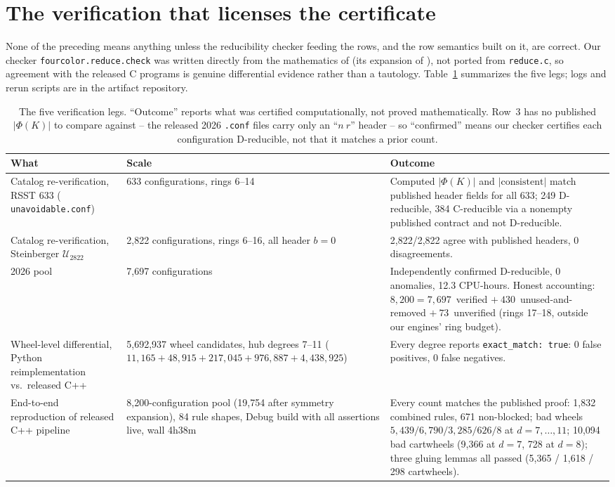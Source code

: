 \documentclass[11pt]{article}
\theoremstyle{definition}
\begin{document}
\section{The verification that licenses the certificate}
\label{sec:verify}

None of the preceding means anything unless the reducibility checker feeding the
rows, and the row semantics built on it, are correct. Our checker
\texttt{fourcolor.reduce.check} was written directly from the mathematics of
\cite{rsst-reduce} (its expansion of \cite[Theorem~(3.2)]{rsst1997}), not ported
from \texttt{reduce.c}, so agreement with the released C programs is genuine
differential evidence rather than a tautology. Table~\ref{tab:verify} summarizes
the five legs; logs and rerun scripts are in the artifact repository.

\begin{table}[t]
\centering
\small
\caption{The five verification legs. ``Outcome'' reports what was certified computationally, not
proved mathematically. Row~3 has no published $|\Phi(K)|$ to compare against -- the released 2026
\texttt{.conf} files carry only an ``$n\ r$'' header -- so ``confirmed'' means our checker certifies
each configuration D-reducible, not that it matches a prior count.}
\label{tab:verify}
\begin{tabular}{@{}p{}p{}p{}@{}}
\toprule
What & Scale & Outcome \\
\midrule
Catalog re-verification, RSST 633 (\cite{rsst-reduce} \texttt{unavoidable.conf}) &
633 configurations, rings 6--14 &
Computed $|\Phi(K)|$ and $|\mathrm{consistent}|$ match published header fields for all 633; 249
D-reducible, 384 C-reducible via a nonempty published contract and not D-reducible. \\
Catalog re-verification, Steinberger $\mathcal{U}_{2822}$ &
2,822 configurations, rings 6--16, all header $b=0$ &
2,822/2,822 agree with published headers, 0 disagreements. \\
2026 pool &
7,697 configurations &
Independently confirmed D-reducible, 0 anomalies, 12.3 CPU-hours. Honest accounting: $8{,}200 =
7{,}697$~verified $+\ 430$~unused-and-removed $+\ 73$~unverified (rings 17--18, outside our
engines' ring budget). \\
Wheel-level differential, Python reimplementation vs.\ released C++ &
5,692,937 wheel candidates, hub degrees 7--11 ($11{,}165 + 48{,}915 + 217{,}045 + 976{,}887 +
4{,}438{,}925$) &
Every degree reports \texttt{exact\_match: true}: 0 false positives, 0 false negatives. \\
End-to-end reproduction of released C++ pipeline &
8,200-configuration pool (19,754 after symmetry expansion), 84 rule shapes, Debug build with all
assertions live, wall 4h38m &
Every count matches the published proof: 1,832 combined rules, 671 non-blocked; bad wheels
$5{,}439/6{,}790/3{,}285/626/8$ at $d{=}7,\dots,11$; 10,094 bad cartwheels (9,366 at $d{=}7$, 728 at
$d{=}8$); three gluing lemmas all passed (5,365 / 1,618 / 298 cartwheels). \\
\bottomrule
\end{tabular}
\end{table}
\end{document}
